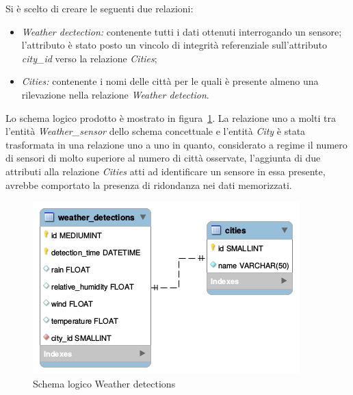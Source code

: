 Si è scelto di creare le seguenti due relazioni:
\begin{itemize}
\item \textit{Weather dectection:} contenente tutti i dati ottenuti interrogando un sensore;
l'attributo è stato posto un vincolo di integrità referenziale sull'attributo
\textit{city\_id} verso la relazione \textit{Cities};
\item \textit{Cities:} contenente i nomi delle città per le quali è presente almeno una
rilevazione nella relazione \textit{Weather detection}.
\end{itemize}
Lo schema logico prodotto è mostrato in figura~\ref{fig:weather_detection_logic}.
La relazione uno a molti tra l'entità \textit{Weather\_sensor} dello schema concettuale e
l'entità \textit{City} è stata trasformata in una relazione uno a uno in quanto, considerato 
a regime il numero di sensori di molto superiore al numero di città osservate, l'aggiunta di
due attributi alla relazione \textit{Cities} atti ad identificare un sensore in essa presente,
avrebbe comportato la presenza di ridondanza nei dati memorizzati.

\begin{figure}[H]                                                                                                                                                            
\centering                                                                                                                                                                   
\includegraphics{diagrams/weather_detection_logic}                                                                                                                                   
\caption{Schema logico Weather detections}                                                                                                                                            
\label{fig:weather_detection_logic}                                                                                                                                                           
\end{figure}

